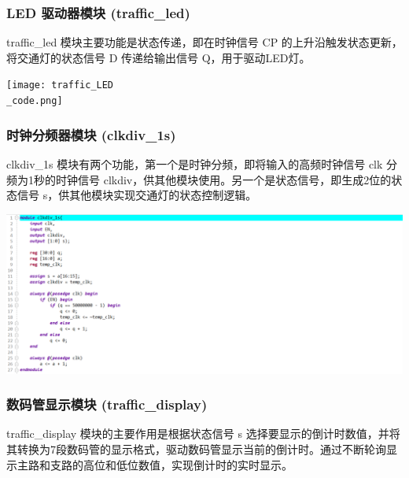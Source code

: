 \documentclass[a4,10pt,zihao=-4]{ctexart}
\begin{document}
\subsubsection{LED 驱动器模块 (traffic\_led)}
traffic\_led 模块主要功能是状态传递，即在时钟信号 CP 的上升沿触发状态更新，将交通灯的状态信号 D 传递给输出信号 Q，用于驱动LED灯。

\vspace{1em}
\noindent\texttt{[image: traffic\_LED\\\_code.png]}



\subsubsection{时钟分频器模块 (clkdiv\_1s)}
clkdiv\_1s 模块有两个功能，第一个是时钟分频，即将输入的高频时钟信号 clk 分频为1秒的时钟信号 clkdiv，供其他模块使用。另一个是状态信号，即生成2位的状态信号 s，供其他模块实现交通灯的状态控制逻辑。

\vspace{1em}
\noindent\includegraphics[width=1\textwidth]{clkdiv_1s_code.png}



\subsubsection{数码管显示模块 (traffic\_display)}
traffic\_display 模块的主要作用是根据状态信号 s 选择要显示的倒计时数值，并将其转换为7段数码管的显示格式，驱动数码管显示当前的倒计时。通过不断轮询显示主路和支路的高位和低位数值，实现倒计时的实时显示。
\end{document}
